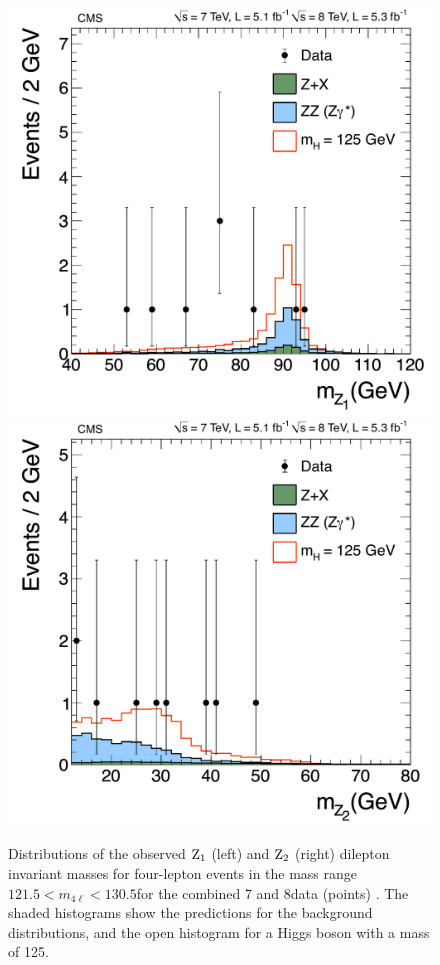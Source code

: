\documentclass[11pt,twoside,a4paper,cmspaper,final,collab]{cms-tdr}
\begin{document}
\begin{figure}[htbp]
   \begin{center}
     \includegraphics[width=0.45\linewidth]{figures/HZZ_MZ1_MainThreeBins_MH125}
     \includegraphics[width=0.45\linewidth]{figures/HZZ_MZ2_MainThreeBins_MH125}
     \caption{
     Distributions of the observed $\mathrm{Z}_1$ (left) and $\mathrm{Z}_2$ (right) dilepton invariant
     masses for four-lepton events in the mass range
     $121.5 < m_{4\ell} < 130.5$\GeV for the combined 7 and 8\TeV data (points) .
     The shaded histograms show the predictions for the background distributions, and the open histogram for
     a Higgs boson with a mass of 125\GeV.
     }
\label{fig:Z1Z2masses}
   \end{center}
\end{figure}
\end{document}
